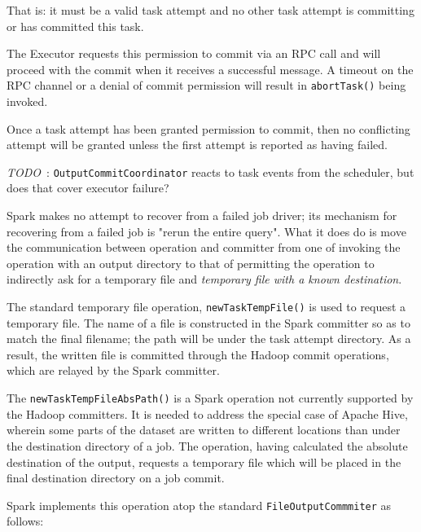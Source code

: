 \documentclass[conference]{IEEEtran}
\newcommand{\TODO}{\emph{TODO}\ }
\begin{document}
That is: it must be a valid task attempt and no other task attempt is
committing or has committed this task.

The Executor requests this permission to commit via an RPC call and will
proceed with the commit when it receives a successful message.
A timeout on the RPC channel or a denial of commit permission will result
in \texttt{abortTask()} being invoked.

Once a task attempt has been granted permission to commit, then no conflicting
attempt will be granted unless the first attempt is reported as having failed.

\TODO: \texttt{OutputCommitCoordinator} reacts to task events from the scheduler, but
does that cover executor failure?

Spark makes no attempt to recover from a failed job driver;
its mechanism for recovering from a failed job is "rerun the entire query".
What it does do is move the communication between operation and committer
from one of invoking the operation with an output directory to
that of permitting the operation to indirectly ask for a temporary file
and \emph{temporary file with a known destination}.

The standard temporary file operation, \texttt{newTaskTempFile()} is used
to request a temporary file.
The name of a file is constructed in the Spark committer so as to match the final filename;
the path will be under the task attempt directory.
As a result, the written file is committed through the Hadoop commit operations,
which are relayed by the Spark committer.

The \texttt{newTaskTempFileAbsPath()} is a Spark operation not currently supported by
the Hadoop committers.
It is needed to address the special case of Apache Hive, wherein
some parts of the dataset are written to different locations than
under the destination directory of a job.
The operation, having calculated the absolute destination of the output,
requests a temporary file which will be placed in the final destination
directory on a job commit.

Spark implements this operation atop the standard \texttt{FileOutputCommmiter}
as follows:
\end{document}
